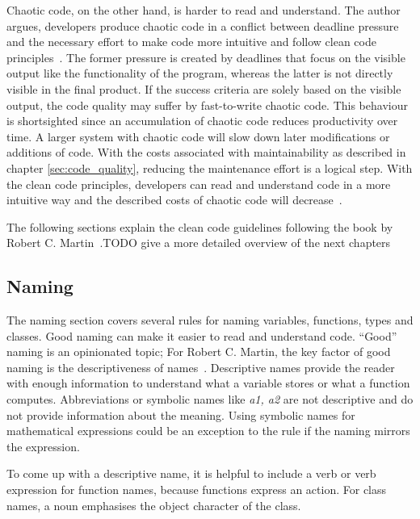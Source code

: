 Chaotic code, on the other hand, is harder to read and understand. The author argues, developers produce chaotic code in a conflict between deadline pressure and the necessary effort to make code more intuitive and follow clean code principles~\cite{martin_clean_2009}. The former pressure is created by deadlines that focus on the visible output like the functionality of the program, whereas the latter is not directly visible in the final product. If the success criteria are solely based on the visible output, the code quality may suffer by fast-to-write chaotic code. This behaviour is shortsighted since an accumulation of chaotic code reduces productivity over time. A larger system with chaotic code will slow down later modifications or additions of code. With the costs associated with maintainability as described in chapter \ref{sec:code_quality}, reducing the maintenance effort is a logical step. With the clean code principles, developers can read and understand code in a more intuitive way and the described costs of chaotic code will decrease~\cite{martin_clean_2009}.



The following sections explain the clean code guidelines following the book by Robert C. Martin~\cite{martin_clean_2009}.TODO give a more detailed overview of the next chapters

\subsection{Naming}\label{sec:naming}
The naming section covers several rules for naming variables, functions, types and classes.
Good naming can make it easier to read and understand code. \enquote{Good} naming is an opinionated topic; For Robert C. Martin, the key factor of good naming is the descriptiveness of names~\cite{martin_clean_2009}. Descriptive names provide the reader with enough information to understand what a variable stores or what a function computes. Abbreviations or symbolic names like \textit{a1, a2} are not descriptive and do not provide information about the meaning. Using symbolic names for mathematical expressions could be an exception to the rule if the naming mirrors the expression.

To come up with a descriptive name, it is helpful to include a verb or verb expression for function names, because functions express an action. For class names, a noun emphasises the object character of the class.


